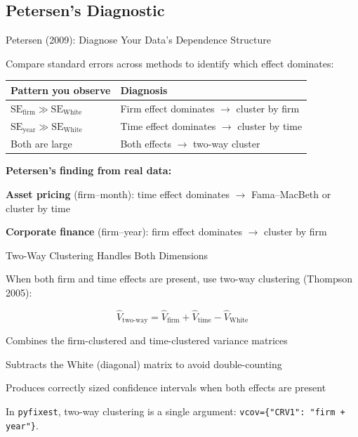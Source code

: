 \documentclass[9pt,aspectratio=169]{beamer}
\begin{document}
\subsection{Petersen's Diagnostic}
\begin{frame}{Petersen (2009): Diagnose Your Data's Dependence Structure}

Compare standard errors across methods to identify which effect dominates:

\bigskip

\begin{tabular}{@{}lp{7cm}@{}}
\toprule
\textbf{Pattern you observe} & \textbf{Diagnosis} \\
\midrule
$\text{SE}_{\text{firm}} \gg \text{SE}_{\text{White}}$ & Firm effect dominates $\to$ cluster by firm \\[0.5em]
$\text{SE}_{\text{year}} \gg \text{SE}_{\text{White}}$ & Time effect dominates $\to$ cluster by time \\[0.5em]
Both are large & Both effects $\to$ two-way cluster \\
\bottomrule
\end{tabular}

\bigskip

\textbf{Petersen's finding from real data:}

\bi
    \item \textbf{Asset pricing} (firm--month): time effect dominates $\to$ Fama--MacBeth or cluster by time
    \item \textbf{Corporate finance} (firm--year): firm effect dominates $\to$ cluster by firm
\ei

\end{frame}


\begin{frame}[fragile]{Two-Way Clustering Handles Both Dimensions}

When both firm and time effects are present, use \alert{two-way clustering} (Thompson 2005):

$$\hat{V}_{\text{two-way}} = \hat{V}_{\text{firm}} + \hat{V}_{\text{time}} - \hat{V}_{\text{White}}$$

\medskip

\bi
    \item Combines the firm-clustered and time-clustered variance matrices
    \item Subtracts the White (diagonal) matrix to avoid double-counting
    \item Produces correctly sized confidence intervals when both effects are present
\ei

\bigskip

\begin{highlightbox}
\centering
In \texttt{pyfixest}, two-way clustering is a single argument: \texttt{vcov=\{"CRV1": "firm + year"\}}.
\end{highlightbox}

\end{frame}
\end{document}
